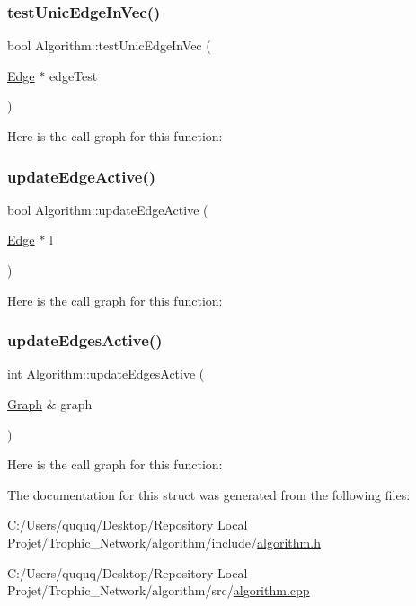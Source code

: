 \subsubsection{\texorpdfstring{test\+Unic\+Edge\+In\+Vec()}{testUnicEdgeInVec()}}
{\footnotesize\ttfamily bool Algorithm\+::test\+Unic\+Edge\+In\+Vec (\begin{DoxyParamCaption}\item[{\mbox{\hyperlink{class_edge}{Edge}} $\ast$}]{edge\+Test }\end{DoxyParamCaption})}

Here is the call graph for this function\+:
\mbox{\label{struct_algorithm_af2d2eace16e689391c4b11e205251657}} 
\subsubsection{\texorpdfstring{update\+Edge\+Active()}{updateEdgeActive()}}
{\footnotesize\ttfamily bool Algorithm\+::update\+Edge\+Active (\begin{DoxyParamCaption}\item[{\mbox{\hyperlink{class_edge}{Edge}} $\ast$}]{l }\end{DoxyParamCaption})}

Here is the call graph for this function\+:
\mbox{\label{struct_algorithm_a75651c6f1997fa2db893b4b3d4a467d8}} 
\subsubsection{\texorpdfstring{update\+Edges\+Active()}{updateEdgesActive()}}
{\footnotesize\ttfamily int Algorithm\+::update\+Edges\+Active (\begin{DoxyParamCaption}\item[{\mbox{\hyperlink{class_graph}{Graph}} \&}]{graph }\end{DoxyParamCaption})}

Here is the call graph for this function\+:


The documentation for this struct was generated from the following files\+:\begin{DoxyCompactItemize}
\item 
C\+:/\+Users/ququq/\+Desktop/\+Repository Local Projet/\+Trophic\+\_\+\+Network/algorithm/include/\mbox{\hyperlink{algorithm_8h}{algorithm.\+h}}\item 
C\+:/\+Users/ququq/\+Desktop/\+Repository Local Projet/\+Trophic\+\_\+\+Network/algorithm/src/\mbox{\hyperlink{algorithm_8cpp}{algorithm.\+cpp}}\end{DoxyCompactItemize}
